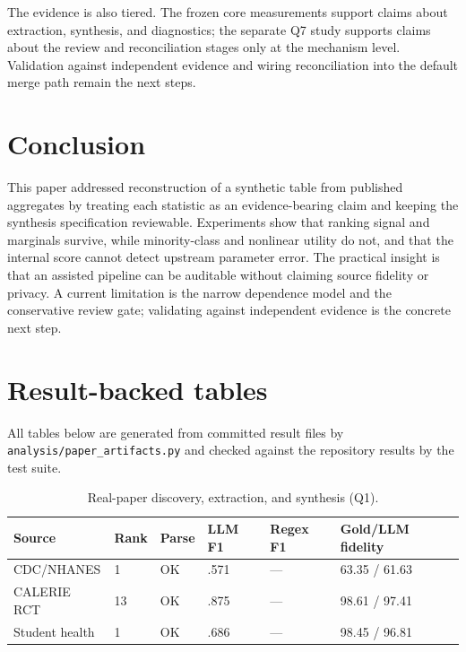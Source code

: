 \documentclass[letterpaper]{article}
\begin{document}
The evidence is also tiered. The frozen core measurements support claims about extraction,
synthesis, and diagnostics; the separate Q7 study supports claims about the review and
reconciliation stages only at the mechanism level. Validation against independent evidence and
wiring reconciliation into the default merge path remain the next steps.

\section{Conclusion}
\label{sec:conclusion}

This paper addressed reconstruction of a synthetic table from published aggregates by treating
each statistic as an evidence-bearing claim and keeping the synthesis specification reviewable.
Experiments show that ranking signal and marginals survive, while minority-class and nonlinear
utility do not, and that the internal score cannot detect upstream parameter error. The practical
insight is that an assisted pipeline can be auditable without claiming source fidelity or privacy.
A current limitation is the narrow dependence model and the conservative review gate; validating
against independent evidence is the concrete next step.

\appendix
\section{Result-backed tables}
\label{sec:appendix}

All tables below are generated from committed result files by
\texttt{analysis/paper\_artifacts.py} and checked against the repository results by the test suite.

\begin{table}[t]
\centering
\begin{tabular}{llllll}
\toprule
Source & Rank & Parse & LLM F1 & Regex F1 & Gold/LLM fidelity \\
\midrule
CDC/NHANES & 1 & OK & .571 & --- & 63.35 / 61.63 \\
CALERIE RCT & 13 & OK & .875 & --- & 98.61 / 97.41 \\
Student health & 1 & OK & .686 & --- & 98.45 / 96.81 \\
\bottomrule
\end{tabular}
\caption{Real-paper discovery, extraction, and synthesis (Q1).}
\label{tab:realpapers}
\end{table}
\end{document}
